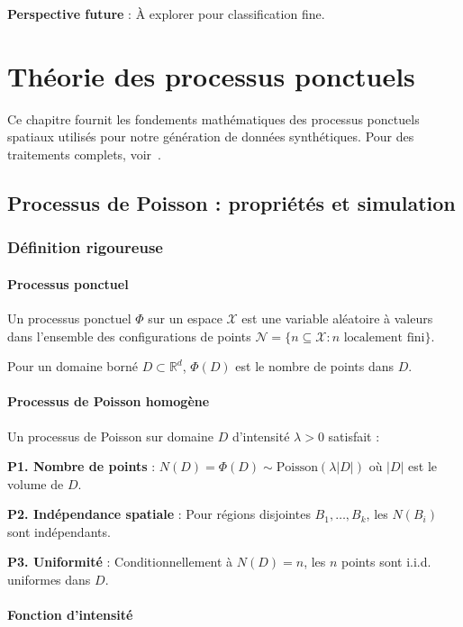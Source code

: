 \textbf{Perspective future} : À explorer pour classification fine.

\chapter{Théorie des processus ponctuels}

Ce chapitre fournit les fondements mathématiques des processus ponctuels spatiaux utilisés pour notre génération de données synthétiques. Pour des traitements complets, voir~\cite{Illian2008,Diggle2013,Baddeley2015}.

\section{Processus de Poisson : propriétés et simulation}

\subsection{Définition rigoureuse}

\subsubsection{Processus ponctuel}

Un processus ponctuel $\Phi$ sur un espace $\mathcal{X}$ est une variable aléatoire à valeurs dans l'ensemble des configurations de points $\mathcal{N} = \{n \subseteq \mathcal{X} : n \text{ localement fini}\}$.

Pour un domaine borné $D \subset \mathbb{R}^d$, $\Phi(D)$ est le nombre de points dans $D$.

\subsubsection{Processus de Poisson homogène}

Un processus de Poisson sur domaine $D$ d'intensité $\lambda > 0$ satisfait :

\textbf{P1. Nombre de points} : $N(D) = \Phi(D) \sim \text{Poisson}(\lambda |D|)$ où $|D|$ est le volume de $D$.

\textbf{P2. Indépendance spatiale} : Pour régions disjointes $B_1, \ldots, B_k$, les $N(B_i)$ sont indépendants.

\textbf{P3. Uniformité} : Conditionnellement à $N(D) = n$, les $n$ points sont i.i.d. uniformes dans $D$.

\subsubsection{Fonction d'intensité}

